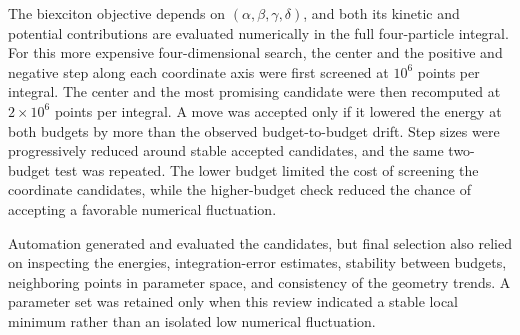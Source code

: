 The biexciton objective depends on $(\alpha,\beta,\gamma,\delta)$, and both its
kinetic and potential contributions are evaluated numerically in the full
four-particle integral. For this more expensive four-dimensional search, the
center and the positive and negative step along each coordinate axis were
first screened at $10^6$ points per integral. The center and the most promising
candidate were then recomputed at $2\times10^6$ points per integral. A move was
accepted only if it lowered the energy at both budgets by more than the
observed budget-to-budget drift. Step sizes were progressively reduced around
stable accepted candidates, and the same two-budget test was repeated. The
lower budget limited the cost of screening the coordinate candidates, while
the higher-budget check reduced the chance of accepting a favorable numerical
fluctuation.

Automation generated and evaluated the candidates, but final selection also
relied on inspecting the energies, integration-error estimates, stability
between budgets, neighboring points in parameter space, and consistency of the
geometry trends. A parameter set was retained only when this review indicated
a stable local minimum rather than an isolated low numerical fluctuation.
